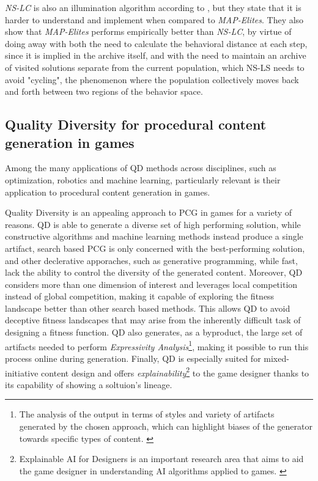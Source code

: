 \documentclass{Configuration_Files/PoliMi3i_thesis}
\begin{document}
\textit{NS-LC} is also an illumination algorithm according to \citeauthor{mouret_illuminating_2015}, but they state that it is harder to understand and implement when compared to \textit{MAP-Elites}. They also show that \textit{MAP-Elites} performs empirically better than \textit{NS-LC}, by virtue of doing away with both the need to calculate the behavioral distance at each step, since it is implied in the archive itself, and with the need to maintain an archive of visited solutions separate from the current population, which NS-LS needs to avoid "cycling", the phenomenon where the population collectively moves back and forth between two regions of the behavior space. \cite{mouret_illuminating_2015}

\subsection{Quality Diversity for procedural content generation in games}
Among the many applications of QD methods across disciplines, such as optimization, robotics and machine learning, particularly relevant is their application to procedural content generation in games.

Quality Diversity is an appealing approach to PCG in games for a variety of reasons. 
QD is able to generate a diverse set of high performing solution, while constructive algorithms and machine learning methods instead produce a single artifact, search based PCG is only concerned with the best-performing solution, and other declerative apporaches, such as generative programming, while fast, lack the ability to control the diversity of the generated content. Moreover, QD considers more than one dimension of interest and leverages local competition instead of global competition, making it capable of exploring the fitness landscape better than other search based methods. This allows QD to avoid deceptive fitness landscapes that may arise from the inherently difficult task of designing a fitness function. QD also generates, as a byproduct, the large set of artifacts needed to perform \textit{Expressivity Analysis}\footnote{The analysis of the output in terms of styles and variety of artifacts generated by the chosen approach, which can highlight biases of the generator towards specific types of content. \cite{gravina_procedural_2019}}, making it possible to run this process online during generation. Finally, QD is especially suited for mixed-initiative content design and offers \textit{explainability}\footnote{Explainable AI for Designers is an important research area that aims to aid the game designer in understanding AI algorithms applied to games. \cite{gravina_procedural_2019}} to the game designer thanks to its capability of showing a soltuion's lineage. \cite{gravina_procedural_2019} 
\end{document}
